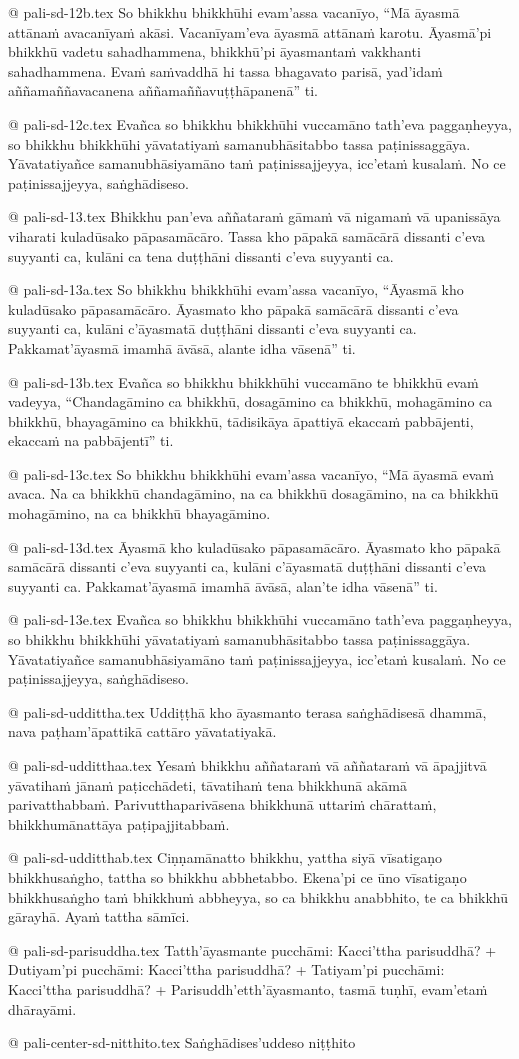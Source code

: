 @ pali-sd-12b.tex
So bhikkhu bhikkhūhi evam’assa vacanīyo, “Mā āyasmā attānaṁ avacanīyaṁ akāsi. Vacanīyam’eva āyasmā attānaṁ karotu. Āyasmā’pi bhikkhū vadetu sahadhammena, bhikkhū’pi āyasmantaṁ vakkhanti sahadhammena. Evaṁ saṁvaddhā hi tassa bhagavato parisā, yad’idaṁ aññamaññavacanena aññamaññavuṭṭhāpanenā” ti.

@ pali-sd-12c.tex
Evañca so bhikkhu bhikkhūhi vuccamāno tath’eva paggaṇheyya, so bhikkhu bhikkhūhi yāvatatiyaṁ samanubhāsitabbo tassa paṭinissaggāya. Yāvatatiyañce samanubhāsiyamāno taṁ paṭinissajjeyya, icc’etaṁ kusalaṁ. No ce paṭinissajjeyya, saṅghādiseso.

@ pali-sd-13.tex
Bhikkhu pan’eva aññataraṁ gāmaṁ vā nigamaṁ vā upanissāya viharati kuladūsako pāpasamācāro. Tassa kho pāpakā samācārā dissanti c’eva suyyanti ca, kulāni ca tena duṭṭhāni dissanti c’eva suyyanti ca.

@ pali-sd-13a.tex
So bhikkhu bhikkhūhi evam’assa vacanīyo, “Āyasmā kho kuladūsako pāpasamācāro. Āyasmato kho pāpakā samācārā dissanti c’eva suyyanti ca, kulāni c’āyasmatā duṭṭhāni dissanti c’eva suyyanti ca. Pakkamat’āyasmā imamhā āvāsā, alante idha vāsenā” ti.

@ pali-sd-13b.tex
Evañca so bhikkhu bhikkhūhi vuccamāno te bhikkhū evaṁ vadeyya, “Chandagāmino ca bhikkhū, dosagāmino ca bhikkhū, mohagāmino ca bhikkhū, bhayagāmino ca bhikkhū, tādisikāya āpattiyā ekaccaṁ pabbājenti, ekaccaṁ na pabbājentī” ti.

@ pali-sd-13c.tex
So bhikkhu bhikkhūhi evam’assa vacanīyo, “Mā āyasmā evaṁ avaca. Na ca bhikkhū chandagāmino, na ca bhikkhū dosagāmino, na ca bhikkhū mohagāmino, na ca bhikkhū bhayagāmino.

@ pali-sd-13d.tex
Āyasmā kho kuladūsako pāpasamācāro. Āyasmato kho pāpakā samācārā dissanti c’eva suyyanti ca, kulāni c’āyasmatā duṭṭhāni dissanti c’eva suyyanti ca. Pakkamat’āyasmā imamhā āvāsā, alan’te idha vāsenā” ti.

@ pali-sd-13e.tex
Evañca so bhikkhu bhikkhūhi vuccamāno tath’eva paggaṇheyya, so bhikkhu bhikkhūhi yāvatatiyaṁ samanubhāsitabbo tassa paṭinissaggāya. Yāvatatiyañce samanubhāsiyamāno taṁ paṭinissajjeyya, icc’etaṁ kusalaṁ. No ce paṭinissajjeyya, saṅghādiseso.

@ pali-sd-uddittha.tex
Uddiṭṭhā kho āyasmanto terasa saṅghādisesā dhammā, nava paṭham’āpattikā cattāro yāvatatiyakā.

@ pali-sd-udditthaa.tex
Yesaṁ bhikkhu aññataraṁ vā aññataraṁ vā āpajjitvā yāvatihaṁ jānaṁ paṭicchādeti, tāvatihaṁ tena bhikkhunā akāmā parivatthabbaṁ. Parivutthaparivāsena bhikkhunā uttariṁ chārattaṁ, bhikkhumānattāya paṭipajjitabbaṁ.

@ pali-sd-udditthab.tex
Ciṇṇamānatto bhikkhu, yattha siyā vīsatigaṇo bhikkhusaṅgho, tattha so bhikkhu abbhetabbo. Ekena’pi ce ūno vīsatigaṇo bhikkhusaṅgho taṁ bhikkhuṁ abbheyya, so ca bhikkhu anabbhito, te ca bhikkhū gārayhā. Ayaṁ tattha sāmīci.

@ pali-sd-parisuddha.tex
Tatth’āyasmante pucchāmi: Kacci’ttha parisuddhā? +
Dutiyam’pi pucchāmi: Kacci’ttha parisuddhā? +
Tatiyam’pi pucchāmi: Kacci’ttha parisuddhā? +
Parisuddh’etth’āyasmanto, tasmā tuṇhī, evam’etaṁ dhārayāmi.

@ pali-center-sd-nitthito.tex
Saṅghādises’uddeso niṭṭhito
